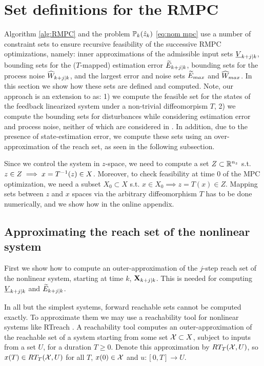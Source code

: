 \section{Set definitions for the RMPC}
\label{sec:set definitions}

Algorithm \ref{alg:RMPC} and the problem $\mathbb{P}_{k}(\hat{z}_{k})$ \eqref{eq:nom mpc} use a number of constraint sets to ensure recursive feasibility of the successive RMPC optimizations, namely: 
inner approximations of the admissible input sets $\underline{V}_{k+j|k}$, 
bounding sets for the ($T$-mapped) estimation error $\widetilde{E}_{k+j|k}$, 
bounding sets for the process noise $\widehat{W}_{k+j|k}$, 
and the largest error and noise sets $\widetilde{E}_{max}$ and $\widehat{W}_{max}$.
In this section we show how these sets are defined and computed. Note, our approach is an extension to \cite{SimonLG13_MPC} as: 1) we compute the feasible set for the states of the feedback linearized system under a non-trivial diffeomorpism $T$, 2) we compute the bounding sets for disturbances while considering estimation error and process noise, neither of which are considered in \cite{SimonLG13_MPC}. In addition, due to the presence of state-estimation error, we compute these sets using an over-approximation of the reach set, as seen in the following subsection.

Since we control the system in $z$-space, we need to compute a set $Z \subset \mathbb{R}^{n_z}$ s.t. $z \in Z \implies x = T^{-1}(z) \in X$.
Moreover, to check feasibility at time 0 of the MPC optimization, we need a subset $X_0 \subset X$ s.t. $x \in X_0 \implies z = T(x) \in Z$.
Mapping sets between $z$ and $x$ spaces via the arbitrary diffeomorphism $T$ has to be done numerically, and we show how in the online appendix. 

 \subsection{Approximating the reach set of the nonlinear system}
 \label{sec:x reach}

 First we show how to compute an outer-approximation of the $j$-step reach set of the nonlinear system, starting at time $k$, $ \mathbf{X}_{k+j|k}$.
This is needed for computing $\underline{V}_{k+j|k}$ and $\widetilde{E}_{k+j|k}$.
 
 In all but the simplest systems, forward reachable sets cannot be computed exactly.
 To approximate them we may use a reachability tool for nonlinear systems like RTreach \cite{JohnsonBCS16_Rtreach}.
 A reachability tool computes an outer-approximation of the reachable set of a system starting from some set $\mathcal{X} \subset X$, subject to inputs from a set $U$, for a duration $T \geq 0$. 
 Denote this approximation by $RT_T(\mathcal{X},U)$, so $x(T) \in RT_T(\mathcal{X},U)$ for all $T$, $x(0) \in \mathcal{X}$ and $u:[0,T] \rightarrow U$.
 
